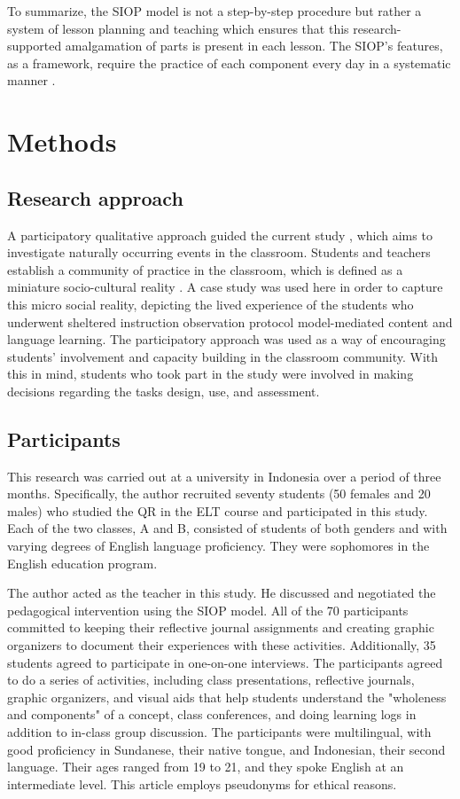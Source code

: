 \documentclass[english]{textolivre}
\begin{document}
To summarize, the SIOP model is not a step-by-step procedure but rather a system of lesson planning and teaching which ensures that this research-supported amalgamation of parts is present in each lesson. The SIOP's features, as a framework, require the practice of each component every day in a systematic manner \cite{echevarria_school_2006,echevarria_using_2011,guarino_sheltered_2001}.

\section{Methods}\label{sec-fmt-manuscrito}
\subsection{Research approach}
A participatory qualitative approach guided the current study \cite{kral_relational_2014}, which aims to investigate naturally occurring events in the classroom. Students and teachers establish a community of practice in the classroom, which is defined as a miniature socio-cultural reality \cite{kusumaningputri_promoting_2018}. A case study was used here in order to capture this micro social reality, depicting the lived experience of the students who underwent sheltered instruction observation protocol model-mediated content and language learning. The participatory approach was used as a way of encouraging students' involvement and capacity building in the classroom community. With this in mind, students who took part in the study were involved in making decisions regarding the tasks design, use, and assessment. 


\subsection{Participants}\label{sec-formato}
This research was carried out at a university in Indonesia over a period of three months. Specifically, the author recruited seventy students (50 females and 20 males) who studied the QR in the ELT course and participated in this study. Each of the two classes, A and B, consisted of students of both genders and with varying degrees of English language proficiency. They were sophomores in the English education program.

The author acted as the teacher in this study. He discussed and negotiated the pedagogical intervention using the SIOP model. All of the 70 participants committed to keeping their reflective journal assignments and creating graphic organizers to document their experiences with these activities. Additionally, 35 students agreed to participate in one-on-one interviews. The participants agreed to do a series of activities, including class presentations, reflective journals, graphic organizers, and visual aids that help students understand the "wholeness and components" of a concept, class conferences, and doing learning logs in addition to in-class group discussion. The participants were multilingual, with good proficiency in Sundanese, their native tongue, and Indonesian, their second language. Their ages ranged from 19 to 21, and they spoke English at an intermediate level. This article employs pseudonyms for ethical reasons.
\end{document}
